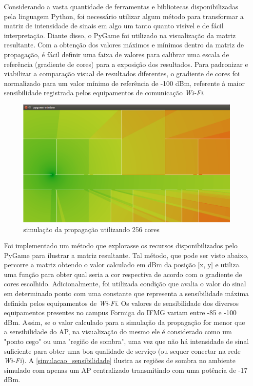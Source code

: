 \documentclass[
	12pt,				%
	openright,			%
	twoside,			%
	a4paper,			%
	english,			%
	french,				%
	spanish,			%
	brazil				%
	]{abntex2}
\begin{document}
Considerando a vasta quantidade de ferramentas e bibliotecas disponibilizadas pela linguagem Python, foi necessário utilizar algum método para transformar a matriz de intensidade de sinais em  algo um tanto quanto visível e de fácil interpretação. Diante disso, o PyGame foi utilizado na visualização da matriz resultante. Com a obtenção dos valores máximos e mínimos dentro da matriz de propagação, é fácil definir uma faixa de valores para calibrar uma escala de referência (gradiente de cores) para a exposição dos resultados. Para padronizar e viabilizar a comparação visual de resultados diferentes, o gradiente de cores foi normalizado para um valor mínimo de referência de -100 dBm, referente à maior sensibilidade registrada pelos equipamentos de comunicação \textit{Wi-Fi}.

\begin{figure}[ht]
	\caption{\label{represetacao_simulacao}simulação da propagação utilizando 256 cores}
	\begin{center}
		\includegraphics[scale=0.4]{images/representacao-simulacao.jpg}
	\end{center}
\end{figure}

Foi implementado um método que explorasse os recursos disponibilizados pelo PyGame para ilustrar a matriz resultante. Tal método, que pode ser visto abaixo, percorre a matriz obtendo o valor calculado em dBm da posição [x, y] e utiliza uma função para obter qual seria a cor respectiva de acordo com o gradiente de cores escolhido. Adicionalmente, foi utilizada condição que avalia o valor do sinal em determinado ponto com uma constante que representa a sensibilidade máxima definida pelos equipamentos de \textit{Wi-Fi}. Os valores de sensibilidade dos diversos equipamentos presentes no campus Formiga do IFMG variam entre -85 e -100 dBm. Assim, se o valor calculado para a simulação da propagação for menor que a sensibilidade do AP, na visualização do mesmo ele é considerado como um "ponto cego" ou uma "região de sombra", uma vez que não há intensidade de sinal suficiente para obter uma boa qualidade de serviço (ou sequer conectar na rede \textit{Wi-Fi}). A \autoref{simulacao_sensibilidade} ilustra as regiões de sombra no ambiente simulado com apenas um AP centralizado transmitindo com uma potência de -17 dBm. 
\end{document}
